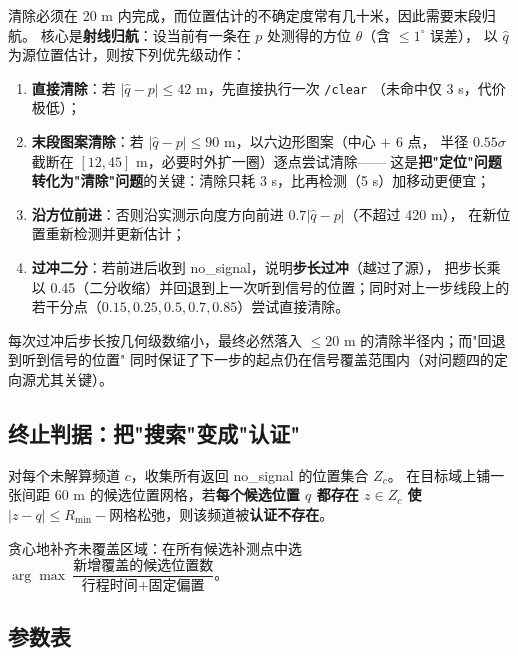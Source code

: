 清除必须在 20 m 内完成，而位置估计的不确定度常有几十米，因此需要末段归航。
核心是\textbf{射线归航}：设当前有一条在 $p$ 处测得的方位 $\hat\theta$（含 $\le1^{\circ}$ 误差），
以 $\hat q$ 为源位置估计，则按下列优先级动作：

\begin{enumerate}[leftmargin=1.8em]
  \item \textbf{直接清除}：若 $|\hat q-p|\le42$ m，先直接执行一次 \texttt{/clear}
        （未命中仅 3 s，代价极低）；
  \item \textbf{末段图案清除}：若 $|\hat q-p|\le90$ m，以六边形图案（中心 $+$ 6 点，
        半径 $0.55\sigma$ 截断在 $[12,45]$ m，必要时外扩一圈）逐点尝试清除——
        这是\textbf{把"定位"问题转化为"清除"问题}的关键：清除只耗 3 s，比再检测（5 s）加移动更便宜；
  \item \textbf{沿方位前进}：否则沿实测示向度方向前进 $0.7|\hat q-p|$（不超过 420 m），
        在新位置重新检测并更新估计；
  \item \textbf{过冲二分}：若前进后收到 no\_signal，说明\textbf{步长过冲}（越过了源），
        把步长乘以 0.45（二分收缩）并回退到上一次听到信号的位置；同时对上一步线段上的
        若干分点（$0.15,0.25,0.5,0.7,0.85$）尝试直接清除。
\end{enumerate}

\begin{keybox}[title=为什么二分能保证收敛]
每次过冲后步长按几何级数缩小，最终必然落入 $\le20$ m 的清除半径内；而"回退到听到信号的位置"
同时保证了下一步的起点仍在信号覆盖范围内（对问题四的定向源尤其关键）。
\end{keybox}

\subsection{终止判据：把"搜索"变成"认证"}

对每个未解算频道 $c$，收集所有返回 no\_signal 的位置集合 $Z_c$。
在目标域上铺一张间距 60 m 的候选位置网格，若\textbf{每个候选位置 $q$ 都存在
$z\in Z_c$ 使 $|z-q|\le R_{\min}-\text{网格松弛}$}，则该频道被\textbf{认证不存在}。

贪心地补齐未覆盖区域：在所有候选补测点中选
$\arg\max\ \dfrac{\text{新增覆盖的候选位置数}}{\text{行程时间}+\text{固定偏置}}$。

\subsection{参数表}

